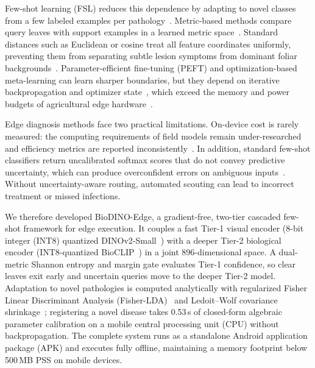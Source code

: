 \documentclass[preprint,12pt]{elsarticle}
\begin{document}
Few-shot learning (FSL) reduces this dependence by adapting to novel classes from a few labeled examples per pathology~\cite{sun2024few}. Metric-based methods compare query leaves with support examples in a learned metric space~\cite{zhao2024mafde,snell2017prototypical}. Standard distances such as Euclidean or cosine treat all feature coordinates uniformly, preventing them from separating subtle lesion symptoms from dominant foliar backgrounds~\cite{bateni2020improved}. Parameter-efficient fine-tuning (PEFT) and optimization-based meta-learning can learn sharper boundaries, but they depend on iterative backpropagation and optimizer state~\cite{hu2022lora,finn2017maml}, which exceed the memory and power budgets of agricultural edge hardware~\cite{radocaj2025evolution}.

Edge diagnosis methods face two practical limitations. On-device cost is rarely measured: the computing requirements of field models remain under-researched and efficiency metrics are reported inconsistently~\cite{radocaj2025evolution}. In addition, standard few-shot classifiers return uncalibrated softmax scores that do not convey predictive uncertainty, which can produce overconfident errors on ambiguous inputs~\cite{guo2017calibration}. Without uncertainty-aware routing, automated scouting can lead to incorrect treatment or missed infections.

We therefore developed BioDINO-Edge, a gradient-free, two-tier cascaded few-shot framework for edge execution. It couples a fast Tier-1 visual encoder (8-bit integer (INT8) quantized DINOv2-Small~\cite{oquab2023dinov2}) with a deeper Tier-2 biological encoder (INT8-quantized BioCLIP~\cite{stevens2024bioclip}) in a joint 896-dimensional space. A dual-metric Shannon entropy and margin gate evaluates Tier-1 confidence, so clear leaves exit early and uncertain queries move to the deeper Tier-2 model. Adaptation to novel pathologies is computed analytically with regularized Fisher Linear Discriminant Analysis (Fisher-LDA)~\cite{fisher1936use,rao1948utilization} and Ledoit--Wolf covariance shrinkage~\cite{ledoit2004well}; registering a novel disease takes 0.53\,s of closed-form algebraic parameter calibration on a mobile central processing unit (CPU) without backpropagation. The complete system runs as a standalone Android application package (APK) and executes fully offline, maintaining a memory footprint below 500\,MB PSS on mobile devices.
\end{document}
